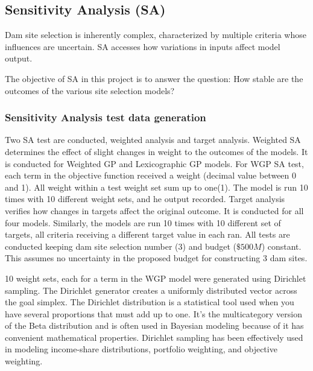 \subsection{Sensitivity Analysis (SA)}
Dam site selection is inherently complex, characterized by multiple criteria whose influences are uncertain. \gls{SA} accesses how variations in inputs affect model output\cite{Jakub2023}.

The objective of \gls{SA} in this project is to answer the question: How stable are the outcomes of the various site selection models?

\subsubsection{Sensitivity Analysis test data generation}
Two \gls{SA} test are conducted, weighted analysis and target analysis. Weighted \gls{SA} determines the effect of slight changes in weight to the outcomes of the models. It is conducted for Weighted GP and Lexicographic GP models. For \gls{WGP} \gls{SA} test, each term in the objective function received a weight (decimal value between 0 and 1). All weight within a test weight set sum up to one(1). The model is run 10 times with 10 different weight sets, and he output recorded. Target analysis verifies how changes in targets affect the original outcome. It is conducted for all four models. Similarly, the models are run 10 times with 10 different set of targets, all criteria receiving a different target value in each ran. All tests are conducted keeping dam site selection number (3) and budget ($\$500M$) constant. This assumes no uncertainty in the proposed budget for constructing 3 dam sites.

10 weight sets, each for a term in the WGP model were generated using Dirichlet sampling\cite{Neal2000}. The Dirichlet generator creates a uniformly distributed vector across the goal simplex. The Dirichlet distribution is a statistical tool used when you have several proportions that must add up to one. It's the multicategory version of the Beta distribution and is often used in Bayesian modeling because of it has convenient mathematical properties\cite{Lin2016}. Dirichlet sampling has been effectively used in modeling income-share distributions, portfolio weighting, and objective weighting\cite{khoi2025,Duangkamon2002,Williams2024}.

